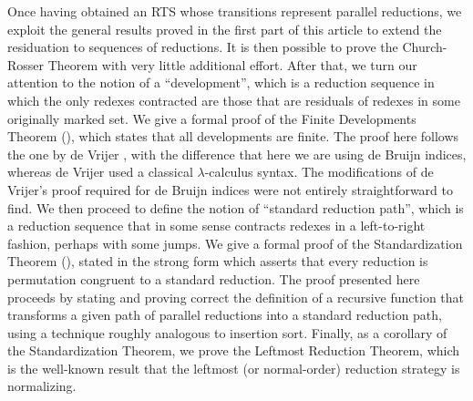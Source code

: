 \documentclass[11pt,notitlepage,a4paper]{report}
\begin{document}
Once having obtained an RTS whose transitions represent parallel reductions,
we exploit the general results proved in the first part of this article to extend the
residuation to sequences of reductions.  It is then possible to prove the Church-Rosser
Theorem with very little additional effort.  After that, we turn our attention to the notion
of a ``development'', which is a reduction sequence in which the only redexes contracted
are those that are residuals of redexes in some originally marked set.
We give a formal proof of the Finite Developments Theorem (\cite{schroer, hindley}),
which states that all developments are finite.
The proof here follows the one by de Vrijer \cite{deVrijer}, with the difference that here we
are using de Bruijn indices, whereas de Vrijer used a classical $\lambda$-calculus syntax.
The modifications of de Vrijer's proof required for de Bruijn indices were not entirely
straightforward to find.
We then proceed to define the notion of ``standard reduction path'', which is a reduction
sequence that in some sense contracts redexes in a left-to-right fashion, perhaps with
some jumps.  We give a formal proof of the Standardization Theorem (\cite{curry-and-feys}),
stated in the strong form which asserts that every reduction is permutation congruent to
a standard reduction.  The proof presented here proceeds by stating and proving correct
the definition of a recursive function that transforms a given path of parallel reductions
into a standard reduction path, using a technique roughly analogous to insertion sort.
Finally, as a corollary of the Standardization Theorem, we prove the Leftmost Reduction
Theorem, which is the well-known result that the leftmost (or normal-order) reduction
strategy is normalizing.



\clearpage
{}
{}



\end{document}
